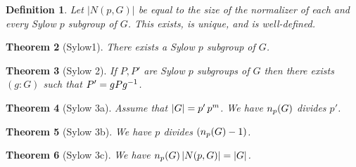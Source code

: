 \documentclass[12pt]{article}
\newtheorem{definition}{Definition}
\newtheorem{theorem}[definition]{Theorem}
\begin{document}
\begin{cnl}
\def\Nz#1#2{|N(#1,#2)|}

\begin{definition}
Let $\Nz{p}{G}$ be equal to
the size of the normalizer of each and every Sylow $p$ subgroup of $G$.
This exists, is unique, and is well-defined.
\end{definition}

\begin{theorem}[Sylow1]
There exists a Sylow $p$ subgroup of $G$.
\end{theorem}

\begin{theorem}[Sylow 2]
If $P, P'$ are Sylow $p$ subgroups of $G$ then there exists $(g : G)$
such that $P' = {g}{P}{g}^{-1}$.
\end{theorem}

\begin{theorem}[Sylow 3a]
Assume that $|G| = p'\,{p}^{m}$.
We have $n_{p}(G)$ divides $p'$.
\end{theorem}

\begin{theorem}[Sylow 3b]
We have $p$ divides $(n_{p}(G) - 1)$.
\end{theorem}

\begin{theorem}[Sylow 3c]
We have $\SylN{p}{G}\*\Nz{p}{G} = |G|$.
\end{theorem}

\end{cnl}
\end{document}
